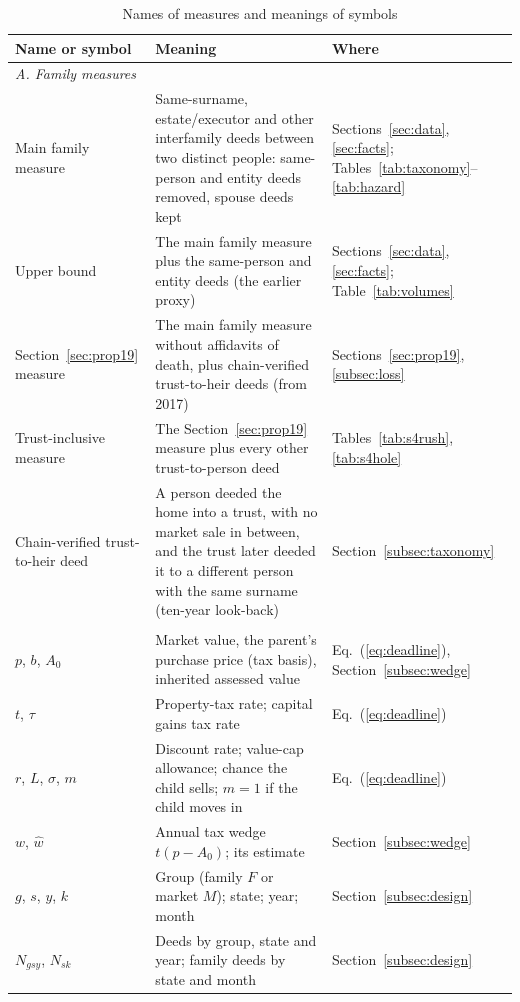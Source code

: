 \begin{table}[!ht]\centering
\caption{Names of measures and meanings of symbols}\label{tab:glossary}
{\footnotesize\setlength{\tabcolsep}{4pt}
\begin{tabular}{p{3.6cm}p{8.6cm}p{2.6cm}}\toprule
Name or symbol & Meaning & Where \\
\midrule
\multicolumn{3}{l}{\emph{A. Family measures}} \\
Main family measure & Same-surname, estate/executor and other interfamily deeds between two distinct people: same-person and entity deeds removed, spouse deeds kept & Sections~\ref{sec:data}, \ref{sec:facts}; Tables~\ref{tab:taxonomy}--\ref{tab:hazard} \\
Upper bound & The main family measure plus the same-person and entity deeds (the earlier proxy) & Sections~\ref{sec:data}, \ref{sec:facts}; Table~\ref{tab:volumes} \\
Section~\ref{sec:prop19} measure & The main family measure without affidavits of death, plus chain-verified trust-to-heir deeds (from 2017) & Sections~\ref{sec:prop19}, \ref{subsec:loss} \\
Trust-inclusive measure & The Section~\ref{sec:prop19} measure plus every other trust-to-person deed & Tables~\ref{tab:s4rush}, \ref{tab:s4hole} \\
Chain-verified trust-to-heir deed & A person deeded the home into a trust, with no market sale in between, and the trust later deeded it to a different person with the same surname (ten-year look-back) & Section~\ref{subsec:taxonomy} \\
\addlinespace
\multicolumn{3}{l}{\emph{B. Symbols}} \\
$p$, $b$, $A_0$ & Market value, the parent's purchase price (tax basis), inherited assessed value & Eq.~(\ref{eq:deadline}), Section~\ref{subsec:wedge} \\
$t$, $\tau$ & Property-tax rate; capital gains tax rate & Eq.~(\ref{eq:deadline}) \\
$r$, $L$, $\sigma$, $m$ & Discount rate; value-cap allowance; chance the child sells; $m=1$ if the child moves in & Eq.~(\ref{eq:deadline}) \\
$w$, $\hat w$ & Annual tax wedge $t(p-A_0)$; its estimate & Section~\ref{subsec:wedge} \\
$g$, $s$, $y$, $k$ & Group (family $F$ or market $M$); state; year; month & Section~\ref{subsec:design} \\
$N_{gsy}$, $N_{sk}$ & Deeds by group, state and year; family deeds by state and month & Section~\ref{subsec:design} \\

\end{tabular}}
\end{table}
